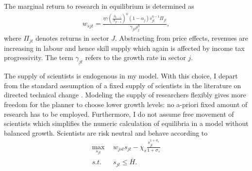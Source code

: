 The marginal return to research in equilibrium is determined as
\begin{align}
w_{sjt}= \frac{\eta \gamma \left(\frac{A_{t-1}}{A_{jt-1}}\right)^\phi (1-\alpha_j)s_{jt}^{\eta-1}\Pi_{jt}}{\gamma_{jt}\rho_j^\eta},
\end{align}
where $\Pi_{jt}$ denotes returns in sector $J$. Abstracting from price effects, revenues are increasing in labour and hence skill supply which again is affected by income tax progressivity. The term $\gamma_{jt}$ refers to the growth rate in sector $j$.

The supply of scientists is endogenous in my model. With this choice, I depart from the standard assumption of a fixed supply of scientists in the literature on directed technical change \cite{Acemoglu2012TheChange, Fried2018ClimateAnalysis}.  Modeling the supply of researchers flexibly gives more freedom for the planner to choose lower growth levels: no a-priori fixed amount of research has to be employed. Furthermore, I do not assume free movement of scientists which simplifies the numeric calculation of equilibria in a model without balanced growth. 
Scientists are risk  neutral and behave according to 
\begin{align}
\underset{s_{jt}}{\max}\ \ & w_{jst}s_{jt}-\chi_s \frac{s_{jt}^{1+\sigma_s}}{1+\sigma_s}\\
s.t. \ \ & s_{jt}\leq \bar{H}.
\end{align}

